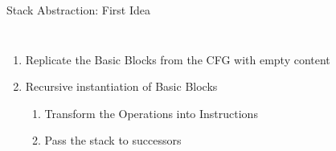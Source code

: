 \documentclass[11pt]{beamer}
\begin{document}
\begin{frame}{Stack Abstraction: First Idea}
\begin{columns}
    \begin{enumerate}
        \item<1-4> Replicate the Basic Blocks from the CFG with empty content
        \item<2-4> Recursive instantiation of Basic Blocks
            \begin{enumerate}
                \item<3-4> Transform the Operations into Instructions
                \item<4> Pass the stack to successors
            \end{enumerate}
    \end{enumerate}
\end{columns}
\end{frame}
\end{document}
